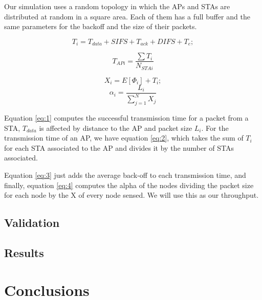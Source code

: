 \documentclass{article}
\begin{document}
Our simulation uses a random topology in which the APs and STAs are distributed at random in a square area. Each of them has a full buffer and the same parameters for the backoff and the size of their packets.

\begin{equation}\label{eq:1}
    T_{i}= T_{data} + SIFS + T_{ack} + DIFS + T_e;
\end{equation}

\begin{equation}\label{eq:2}
    T_{APi}=\frac{\sum T_i}{N_{STAi}}
\end{equation}

\begin{equation}\label{eq:3}
   X_i=E[\Phi_i]+T_i;
\end{equation}
\begin{equation}\label{eq:4}
    \alpha_i = \frac{L_i}{\sum_{j=1}^{N} X_{j}}
\end{equation}

Equation \ref{eq:1} computes the successful transmission time for a packet from a STA, $T_{data}$ is affected by distance to the AP and packet size $L_i$. For the transmission time of an AP, we have equation \ref{eq:2}, which takes the sum of $T_i$ for each STA associated to the AP and divides it by the number of STAs associated.

Equation \ref{eq:3} just adds the average back-off to each transmission time, and finally, equation \ref{eq:4} computes the alpha of the nodes dividing the packet size for each node by the X of every node sensed. We will use this as our throughput.

	\subsection{Validation}
	\label{section:validation}
	
	\subsection{Results}
	\label{section:results}

\section{Conclusions}
\label{section:conclusions}



\end{document}
